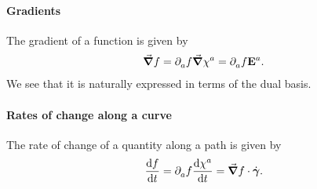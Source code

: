 \paragraph{Gradients}
The gradient of a function is given by
\begin{align*}
	\grad{f} = \partial^{}_{a}f\grad{\chi^{a}} = \partial^{}_{a}f\vb{E}^{a}.
\end{align*}
We see that it is naturally expressed in terms of the dual basis.

\paragraph{Rates of change along a curve}
The rate of change of a quantity along a path is given by
\begin{align*}
	\dv{f}{t} = \partial^{}_{a}f\dv{\chi^{a}}{t} = \grad{f}\cdot\dot{\vb*{\gamma}}.
\end{align*}